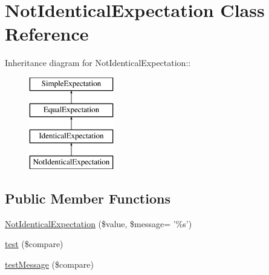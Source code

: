 \hypertarget{class_not_identical_expectation}{
\section{NotIdenticalExpectation Class Reference}
\label{class_not_identical_expectation}
}
Inheritance diagram for NotIdenticalExpectation::\begin{figure}[H]
\begin{center}
\leavevmode
\includegraphics[height=4cm]{class_not_identical_expectation}
\end{center}
\end{figure}
\subsection*{Public Member Functions}
\begin{DoxyCompactItemize}
\item 
\hyperlink{class_not_identical_expectation_aa5ce1dd742efb85e079bd219234f0e99}{NotIdenticalExpectation} (\$value, \$message= '\%s')
\item 
\hyperlink{class_not_identical_expectation_a2e3d68e7804396cb418a9ef2d00c128e}{test} (\$compare)
\item 
\hyperlink{class_not_identical_expectation_a4d2927f2f29f63f7cff7e0e24a555d85}{testMessage} (\$compare)
\end{DoxyCompactItemize}


